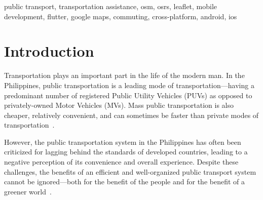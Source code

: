 \documentclass[journal]{./IEEE/IEEEtran}
\title{\SPTITLE}
\author{\ADVISEE~and~\ADVISER%
\REMARK
}
\begin{document}
\maketitle

\begin{abstract}
Public transportation is a leading mode of transportation in the Philippines, but the public transportation system has often been criticized for lagging behind the standards of developed countries.
There is a lack of travel applications specifically tailored for public transportation assistance, and the current choices are limited and have limitations.
The goal of this paper is to develop the basis of a `commuter first' multimodal trip planning travel companion for mobile devices that commuters can use on demand and anywhere.
This is especially important for first-time commuters to an area.
Similarly, community-driven input is also important in molding a standardized transit feed dataset.
To leverage this need, the application will give users power to request the creation and modification of routes.
This project has the potential to improve the Quality of Life (QoL) of many commuters, especially those who are first time commuters to a certain place.
It can also help commuters be aware of traffic congestions and make the proper decisions in exploring other possible and more efficient routes. 
\end{abstract}

\begin{keywords}
public transport, transportation assistance, osm, osrs, leaflet, mobile development, flutter, google maps, commuting, cross-platform, android, ios
\end{keywords}

\section{Introduction}
Transportation plays an important part in the life of the modern man. In the Philippines, public transportation is a leading mode of transportation---having a predominant number of registered Public Utility Vehicles (PUVs) as opposed to privately-owned Motor Vehicles (MVs).
Mass public transportation is also cheaper, relatively convenient, and can sometimes be faster than private modes of transportation~\cite{Narboneta16}.

However, the public transportation system in the Philippines has often been criticized for lagging behind the standards of developed countries, leading to a negative perception of its convenience and overall experience. Despite these challenges, the benefits of an efficient and well-organized public transport system cannot be ignored---both for the benefit of the people and for the benefit of a greener world~\cite{Lagua19}.
\end{document}
